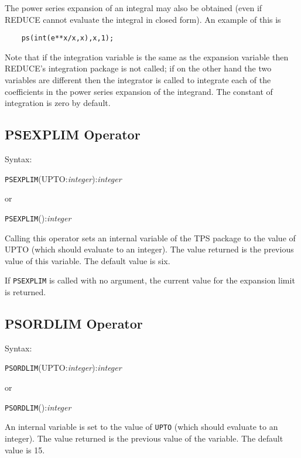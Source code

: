 The power series expansion of an integral may also be obtained (even if
REDUCE cannot evaluate the integral in closed form).  An example of
this is

\begin{verbatim}
    ps(int(e**x/x,x),x,1);
\end{verbatim}
 
Note that if the integration variable is the same as the expansion
variable then REDUCE's integration package is not called; if on the
other hand the two variables are different then the integrator is
called to integrate each of the coefficients in the power series
expansion of the integrand.  The constant of integration is zero by
default.   
 
\subsection{PSEXPLIM Operator}

Syntax:

\hspace*{2em} {\tt PSEXPLIM}(UPTO:{\em integer}):{\em integer}

\hspace*{4em} or

\hspace*{2em} {\tt PSEXPLIM}():{\em integer}

Calling this operator sets an internal variable of the
TPS package to the value of UPTO (which should evaluate to an integer).
The value returned is the previous value of this variable.
The default value is six.
 
If {\tt PSEXPLIM} is called with no argument, the current value for
the expansion limit is returned.
 

\subsection{PSORDLIM Operator}

Syntax:

\hspace*{2em} {\tt PSORDLIM}(UPTO:{\em integer}):{\em integer}

\hspace*{4em} or

\hspace*{2em} {\tt PSORDLIM}():{\em integer}

An internal variable is set to the value of {\tt UPTO} (which should
evaluate to an integer). The value returned is the previous value of
the variable.  The default value is 15.

